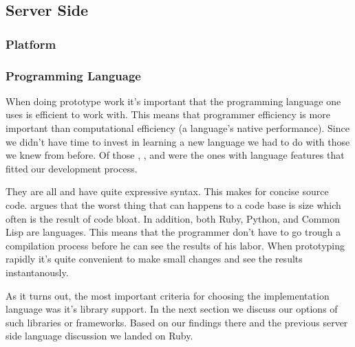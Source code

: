 \subsection{Server Side}

\subsubsection{Platform}

\subsubsection{Programming Language}

When doing prototype work it's important that the programming language one
uses is efficient to work with. This means that programmer efficiency is more
important than computational efficiency (a language's native performance).
Since we didn't have time to invest in learning a new language we had to do
with those we knew from before. Of those %
,
%
, and
%
were the ones with language features that fitted our development process.

They are all %
and have quite expressive syntax. This makes for concise source code.
\citet{yegge07} argues that the worst thing that can happens to a code base is
size which often is the result of code bloat. In addition, both Ruby, Python,
and Common Lisp are  languages. This means that the
programmer don't have to go trough a compilation process before he can see the
results of his labor. When prototyping rapidly it's quite convenient to make
small changes and see the results instantanously.




As it turns out, the most important criteria for choosing the implementation
language was it's library support. In the next section we discuss our options
of such libraries or frameworks. Based on our findings there and the
previous server side language discussion we landed on Ruby.

